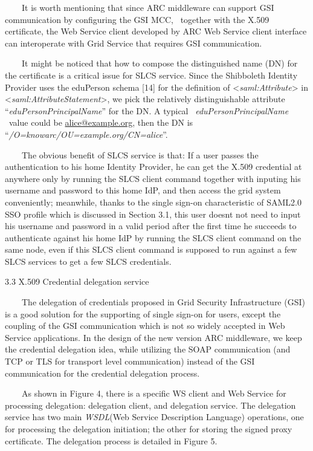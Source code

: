 \documentclass{article}
\begin{document}
\ \ \ \ It is worth mentioning that since ARC middleware can support GSI
communication by configuring the GSI MCC, \ together with the X.509
certificate, the Web Service client developed by ARC Web Service client
interface can interoperate with Grid Service that requires GSI
communication.

\ \ \ \ It might be noticed that how to compose the distinguished name
(DN) for the certificate is a critical issue for SLCS service. Since
the Shibboleth Identity Provider uses the eduPerson schema [14] for the
definition of {\textless}\textit{saml:Attribute}{\textgreater} in
{\textless}\textit{saml:AttributeStatement}{\textgreater}, we pick the
relatively distinguishable attribute
{\textquotedblleft}\textit{eduPersonPrincipalName}{\textquotedblright}
for the DN. A typical \ \textit{eduPersonPrincipalName} \ value could
be \href{mailto:alice@example.org}{alice@example.org}, then the DN is
{\textquotedblleft}\textit{/O=knowarc/OU=example.org/CN=alice}{\textquotedblright}.

\ \ \ \ The obvious benefit of SLCS service is that: If a user passes
the authentication to his home Identity Provider, he can get the X.509
credential at anywhere only by running the SLCS client command together
with inputing his username and password to this home IdP, and then
access the grid system conveniently; meanwhile, thanks to the single
sign-on characteristic of SAML2.0 SSO profile which is discussed in
Section 3.1, this user doesn{\textquotesingle}t not need to input his
username and password in a valid period after the first time he
succeeds to authenticate against his home IdP by running the SLCS
client command on the same node, even if this SLCS client command is
supposed to run against a few SLCS services to get a few SLCS
credentials.


\bigskip

3.3 X.509 Credential delegation service

\ \ \ \ The delegation of credentials proposed in Grid Security
Infrastructure (GSI) is a good solution for the supporting of single
sign-on for users, except the coupling of the GSI communication which
is not so widely accepted in Web Service applications. In the design of
the new version ARC middleware, we keep the credential delegation idea,
while utilizing the SOAP communication (and TCP or TLS for transport
level communication) instead of the GSI communication for the
credential delegation process.

\ \ \ \ As shown in Figure 4, there is a specific WS client and Web
Service for processing delegation: delegation client, and delegation
service. The delegation service has two main \textit{WSDL}(Web Service
Description Language) operations, one for processing the delegation
initiation; the other for storing the signed proxy certificate. The
delegation process is detailed in Figure 5. 
\end{document}
